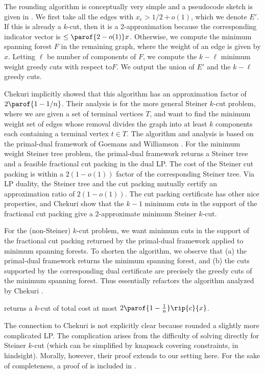 \documentclass{toc}
\newcommand{\wrt}{with respect to\xspace} %
\begin{document}
The rounding algorithm is conceptually very simple and a pseudocode
sketch is given in .  We first take
all the edges with $x_e > 1/2 + o(1)$, which we denote $E'$. If this
is already a $k$-cut, then it is a 2-approximation because the
corresponding indicator vector is $\leq \parof{2 - o(1)}
x$. Otherwise, we compute the minimum spanning forest $F$ in the
remaining graph, where the weight of an edge is given by
$x$. Letting $\ell$ be number of components of $F$, we compute the
$k - \ell$ minimum weight greedy cuts \wrt $F$.  We output the
union of $E'$ and the $k-\ell$ greedy cuts.

Chekuri \etal \cite{cgn-06} implicitly showed that this algorithm has
an approximation factor of $2 \parof{1 - 1/n}$. Their analysis is for
the more general Steiner $k$-cut problem, where we are given a set of
terminal vertices $T$, and want to find the minimum weight set of
edges whose removal divides the graph into at least $k$ components
each containing a terminal vertex $t \in T$. The algorithm and
analysis is based on the primal-dual framework of Goemans and
Williamson \cite{gw-95,gw-96}. For the minimum weight Steiner tree
problem, the primal-dual framework returns a Steiner tree and a
feasible fractional cut packing in the dual LP. The cost of the
Steiner cut packing is within a $2(1- o(1))$ factor %
of the corresponding Steiner tree. Via LP duality, the Steiner tree
and the cut packing mutually certify an approximation ratio of
$2(1-o(1))$. The cut packing certificate has other nice properties,
and Chekuri \etal \cite{cgn-06} show that the $k-1$ minimum cuts in
the support of the fractional cut packing give a 2-approximate
minimum %
Steiner $k$-cut.

For the (non-Steiner) $k$-cut problem, we want minimum cuts in the
support of the fractional cut packing returned by the primal-dual
framework applied to minimum spanning forests. To shorten the
algorithm, we observe that (a) the primal-dual framework returns the
minimum spanning forest, and (b) the cuts supported by the
corresponding dual certificate are precisely the greedy cuts of the
minimum spanning forest. Thus  essentially refactors
the algorithm analyzed by Chekuri \etal \cite{cgn-06}.

\newcommand{\GreedyCutsApx}{\algo{greedy-cuts} returns a $k$-cut of
  total cost at most $2 \parof{1 - \frac{1}{n}} \rip{c}{x}$.}
\begin{lemma}
  \GreedyCutsApx
\end{lemma}
The connection to Chekuri \etal \cite{cgn-06} is not explicitly clear
because \cite{cgn-06} rounded a slightly more complicated LP. The
complication arises from the difficulty of solving 
directly for Steiner $k$-cut (which can be simplified by knapsack
covering constraints, in hindsight). Morally, however, their proof
extends to our setting here. For the sake of completeness, a proof of
 is included in
.
\end{document}
